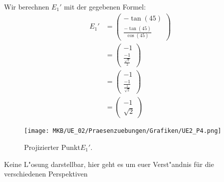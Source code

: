 \begin{Loesung}
\begin{Teilloesungen}
\usetikzlibrary{calc}

\item Wir berechnen $E_1'$ mit der gegebenen 	Formel: \\
	\begin{align*}
		E_1' &= \begin{pmatrix}- \tan(45)\\  \frac{- \tan(45)}{{\cos(45)}}\end{pmatrix}\\	
		&= \begin{pmatrix}-1\\  \frac{-1}{\frac{\sqrt{2}}{2}}\end{pmatrix}\\
		&= \begin{pmatrix}-1\\  \frac{-1}{\frac{1}{\sqrt{2}}}\end{pmatrix}\\	
		&= \begin{pmatrix}-1\\ \sqrt{2} \end{pmatrix}
	\end{align*}

\begin{figure}[H]
	\centering
	\texttt{[image: MKB/UE\_02/Praesenzuebungen/Grafiken/UE2\_P4.png]}
	\caption{Projizierter Punkt$E_1'$.}
	\label{fig.P4}
\end{figure}
	
\item Keine L"osung darstellbar, hier geht es um euer Verst"andnis für die verschiedenen Perspektiven
\end{Teilloesungen}
\end{Loesung}
